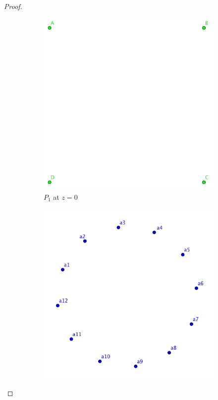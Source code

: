 \begin{proof}
\begin{figure}[!htb]
\centering
\begin{subfigure}[b]{.25\linewidth}
\includegraphics[width=\linewidth]{layer1square}
\caption{$P_1$ at $z=0$}\label{fig:layer1}
\end{subfigure}\hspace{10 mm}
\begin{subfigure}[b]{.25\linewidth}
\includegraphics[width=\linewidth]{layer2regular}

\end{subfigure}
\end{figure}
\end{proof}
